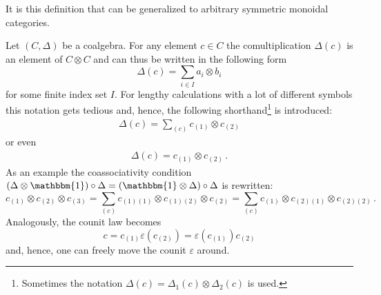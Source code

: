 
    \begin{remark}
        It is this definition that can be generalized to arbitrary symmetric monoidal categories.
    \end{remark}

    \begin{notation}
        Let $(C,\Delta)$ be a coalgebra. For any element $c\in C$ the comultiplication $\Delta(c)$ is an element of $C\otimes C$ and can thus be written in the following form \[\Delta(c) = \sum_{i\in I}a_i\otimes b_i\] for some finite index set $I$. For lengthy calculations with a lot of different symbols this notation gets tedious and, hence, the following shorthand\footnote{Sometimes the notation $\Delta(c) = \Delta_1(c)\otimes\Delta_2(c)$ is used.} is introduced:
        \begin{gather}
            \Delta(c) = \sum_{(c)}c_{(1)}\otimes c_{(2)}
        \end{gather}
        or even
        \begin{gather}
            \Delta(c) = c_{(1)}\otimes c_{(2)}\,.
        \end{gather}
        As an example the coassociativity condition $(\Delta\otimes\mathbbm{1})\circ\Delta = (\mathbbm{1}\otimes\Delta)\circ\Delta$ is rewritten: \[c_{(1)}\otimes c_{(2)}\otimes c_{(3)} = \sum_{(c)} c_{(1)(1)}\otimes c_{(1)(2)}\otimes c_{(2)} = \sum_{(c)} c_{(1)}\otimes c_{(2)(1)}\otimes c_{(2)(2)}\,.\] Analogously, the counit law becomes \[c = c_{(1)}\varepsilon(c_{(2)}) = \varepsilon(c_{(1)})c_{(2)}\] and, hence, one can freely move the counit $\varepsilon$ around.
    \end{notation}

